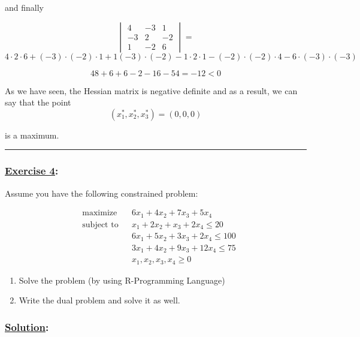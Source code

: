 \documentclass[
]{article}
\providecommand{\tightlist}{%
  \setlength{\itemsep}{0pt}\setlength{\parskip}{0pt}}
\begin{document}
and finally

\[
\begin{vmatrix}
4 & -3 & 1 \\
-3 & 2 &-2 \\
1 & -2 & 6
\end{vmatrix} = 
\] \[
4\cdot2\cdot6 + (-3)\cdot(-2)\cdot1 + 1(-3)\cdot(-2) - 1\cdot2\cdot1 -  (-2)\cdot(-2)\cdot4 -6\cdot(-3)\cdot(-3)
\]

\[
48 + 6 +6 - 2 -16 -54 = -12 < 0
\]

As we have seen, the Hessian matrix is negative definite and as a
result, we can say that the point \[
(x_1^*,x_2^*,x_3^*)=(0,0,0)
\]

is a maximum.

\begin{center}\rule{0.5\linewidth}{0.5pt}\end{center}

\hypertarget{section-6}{%
\subsubsection{\texorpdfstring{\underline{Exercise 4}:}{:}}\label{section-6}}

Assume you have the following constrained problem:

\[
\begin{aligned}
& \text{maximize}
& & 6x_1 +4x_2 +7x_3 +5x_4 \\
& \text{subject to}
& & x_1 +2x_2 + x_3 +2x_4 \leq 20 \\
&&& 6x_1 +5x_2 +3x_3 +2x_4 \leq 100 \\
&&& 3x_1 +4x_2 +9x_3 +12x_4 \leq 75 \\
&&& x_1,x_2,x_3,x_4 \geq 0
\end{aligned}
\]

\begin{enumerate}
\def\labelenumi{\alph{enumi}.}
\tightlist
\item
  Solve the problem (by using R-Programming Language)
\item
  Write the dual problem and solve it as well.
\end{enumerate}

\hypertarget{section-7}{%
\subsubsection{\texorpdfstring{\underline{Solution}:}{:}}\label{section-7}}
\end{document}
